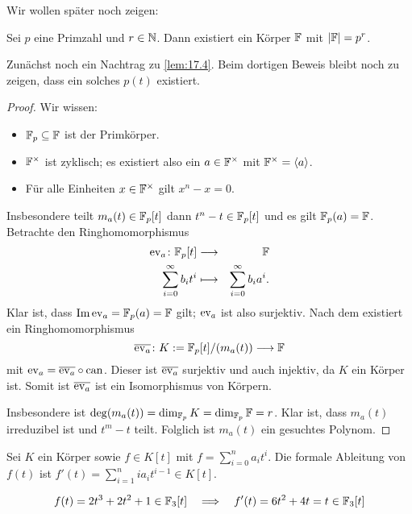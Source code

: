 \documentclass[12pt,a4paper]{scrartcl}
\begin{document}

Wir wollen später noch zeigen:
\begin{satz}\label{thm:18.1}
	Sei $p$ eine Primzahl und $r\in\mathbb N$. Dann existiert ein Körper $\mathbb F$ mit $|\mathbb F| = p^r$.
\end{satz}

\medskip

Zunächst noch ein {Nachtrag\label{nachtrag zu 17.4}} zu \cref{lem:17.4}. Beim dortigen Beweis bleibt noch zu zeigen, dass ein solches $p(t)$ existiert.
\begin{proof}
	Wir wissen:
	\begin{itemize}
		\item $\mathbb F_p\subseteq \mathbb F$ ist der Primkörper.
		\item $\mathbb F^{\times}$ ist zyklisch; es existiert also ein $a\in\mathbb F^{\times}$ mit $\mathbb F^{\times} = \langle a\rangle$.
		\item Für alle Einheiten $x\in \mathbb F^{\times}$ gilt $x^n-x = 0$.
	\end{itemize}
	Insbesondere teilt $m_a(t)\in\mathbb F_p[t]$ dann $t^n-t\in\mathbb F_p[t]$ und es gilt $\mathbb F_p(a) = \mathbb F$. Betrachte den Ringhomomorphismus
	\begin{eqnarray*}
		\operatorname{ev}_a\colon \mathbb F_p[t] & \longrightarrow & \mathbb F\\
		\sum_{i = 0}^{\infty} b_it^i & \longmapsto &\sum_{i = 0}^{\infty}b_ia^i.
	\end{eqnarray*}
	Klar ist, dass $\operatorname{Im}\operatorname{ev}_a = \mathbb F_p(a) = \mathbb F$ gilt; $\operatorname{ev}_a$ ist also surjektiv. Nach dem  existiert ein Ringhomomorphismus
	\[\overline{\operatorname{ev}_a}\colon K := \mathbb F_p[t]/(m_a(t))\longrightarrow \mathbb F\]
	mit $\operatorname{ev}_a = \overline{\operatorname{ev}_a}\circ\operatorname{can}$. Dieser ist $\overline{\operatorname{ev}_a}$ surjektiv und auch injektiv, da $K$ ein Körper ist. Somit ist $\overline{\operatorname{ev}_a}$ ist ein Isomorphismus von Körpern.
	
	Insbesondere ist $\deg(m_a(t)) = \dim_{\mathbb F_p}K = \dim_{\mathbb F_p}\mathbb F= r$. Klar ist, dass $m_a(t)$ irreduzibel ist und $t^m-t$ teilt. Folglich ist $m_a(t)$ ein gesuchtes Polynom.
\end{proof}

\begin{defi}
	Sei $K$ ein Körper sowie $f\in K[t]$ mit $f = \sum_{i = 0}^n a_it^i$. Die formale Ableitung von $f(t)$ ist $f'(t) = \sum_{i = 1}^{n} ia_it^{i-1}\in K[t]$.
\end{defi}
\begin{bsp}
	\[
	f(t) = 2t^3+2t^2+1\in \mathbb F_3[t] \quad \Longrightarrow \quad f'(t) = 6t^2 + 4t = t\in\mathbb F_3[t]
	\]
\end{bsp}
\end{document}

